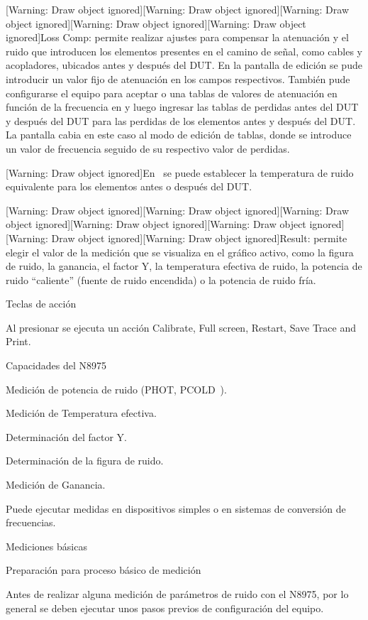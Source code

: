 \documentclass[paper=letter,oneside,fontsize=10pt,parskip=full]{article}
\begin{document}
[Warning: Draw object ignored][Warning: Draw object ignored][Warning: Draw object ignored][Warning: Draw object
ignored][Warning: Draw object ignored]Loss Comp: permite realizar ajustes para compensar la atenuación y el ruido que
introducen los elementos presentes en el camino de señal, como cables y acopladores, ubicados antes y después del DUT.
En la pantalla de edición se pude introducir un valor fijo de atenuación en los campos respectivos. También pude
configurarse el equipo para aceptar o una tablas de valores de atenuación en función de la frecuencia en y luego
ingresar las tablas de perdidas antes del DUT y después del DUT para las perdidas de los elementos antes y después del
DUT. La pantalla cabia en este caso al modo de edición de tablas, donde se introduce un valor de frecuencia seguido de
su respectivo valor de perdidas.

[Warning: Draw object ignored]En \ se puede establecer la temperatura de ruido equivalente para los elementos antes o
después del DUT.


\bigskip

[Warning: Draw object ignored][Warning: Draw object ignored][Warning: Draw object ignored][Warning: Draw object
ignored][Warning: Draw object ignored][Warning: Draw object ignored][Warning: Draw object ignored]Result: permite
elegir el valor de la medición que se visualiza en el gráfico activo, como la figura de ruido, la ganancia, el factor
Y, la temperatura efectiva de ruido, la potencia de ruido “caliente” (fuente de ruido encendida) o la potencia de ruido
fría.

\clearpage
\bigskip

Teclas de acción

Al presionar se ejecuta un acción Calibrate, Full screen, Restart, Save Trace and Print.

Capacidades del N8975

Medición de potencia de ruido (PHOT, PCOLD~).

Medición de Temperatura efectiva.

Determinación del factor Y.

Determinación de la figura de ruido.

Medición de Ganancia.

Puede ejecutar medidas en dispositivos simples o en sistemas de conversión de frecuencias.

Mediciones básicas

Preparación para proceso básico de medición

Antes de realizar alguna medición de parámetros de ruido con el N8975, por lo general se deben ejecutar unos pasos
previos de configuración del equipo.
\end{document}
